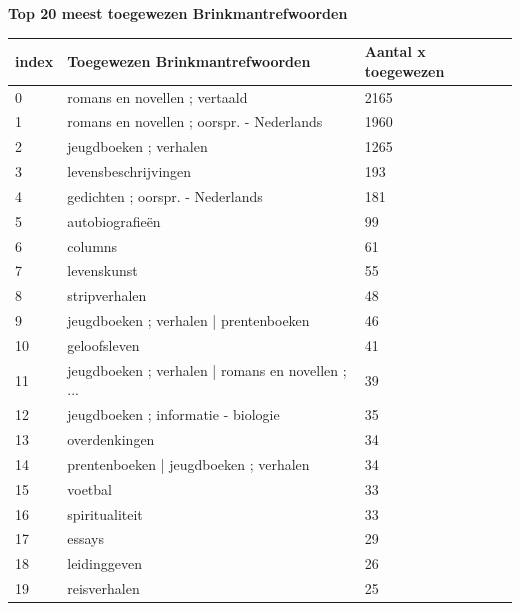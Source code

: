 \documentclass{article}
\begin{document}
\textbf{Top 20 meest toegewezen Brinkmantrefwoorden}


\begin{tabular}{| l | l | l |}
\hline
\textbf{index} & \textbf{Toegewezen Brinkmantrefwoorden} & \textbf{Aantal x toegewezen} \\
\hline
0  &           romans en novellen ; vertaald                       &  2165  \\
1  &           romans en novellen ; oorspr. - Nederlands           &  1960  \\
2  &                              jeugdboeken ; verhalen           &  1265  \\
3  &                                levensbeschrijvingen           &  193   \\
4  &                    gedichten ; oorspr. - Nederlands           &  181   \\
5  &                                    autobiografieën            &  99    \\
6  &                                             columns           &  61    \\
7  &                                         levenskunst           &  55    \\
8  &                                       stripverhalen           &  48    \\
9  &              jeugdboeken ; verhalen | prentenboeken           &  46    \\ 
10 &                                       geloofsleven            &  41    \\
11 &  jeugdboeken ; verhalen | romans en novellen ; ...            &  39    \\
12 &                jeugdboeken ; informatie - biologie            &  35    \\
13 &                                      overdenkingen            &  34    \\
14 &             prentenboeken | jeugdboeken ; verhalen            &  34    \\
15 &                                            voetbal            &  33    \\
16 &                                     spiritualiteit            &  33    \\
17 &                                             essays            &  29    \\
18 &                                       leidinggeven            &  26    \\
19 &                                       reisverhalen            &  25    \\
\hline
\end{tabular}
\end{document}

